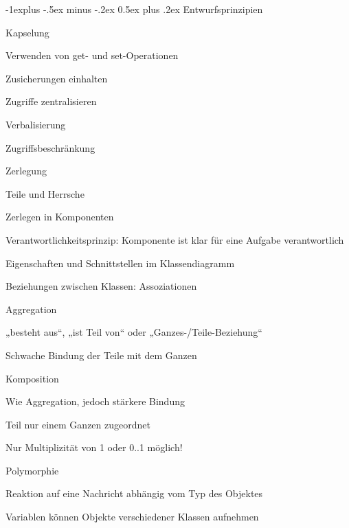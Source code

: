 \documentclass[a4paper]{article}
\makeatletter
\renewcommand{\subsection}{\@startsection{subsection}{2}{0mm}%
                                {-1explus -.5ex minus -.2ex}%
                                {0.5ex plus .2ex}%
                                {\normalfont\normalsize\bfseries}}
\makeatother
\begin{document}
\begin{multicols}{3}
  \subsection{Entwurfsprinzipien}
  \begin{itemize*}
    \item Kapselung
    \begin{itemize*}
      \item Verwenden von get- und set-Operationen
      \item Zusicherungen einhalten
      \item Zugriffe zentralisieren
      \item Verbalisierung
      \item Zugriffsbeschränkung
    \end{itemize*}
    \item Zerlegung
    \begin{itemize*}
      \item Teile und Herrsche
      \item Zerlegen in Komponenten
      \item Verantwortlichkeitsprinzip: Komponente ist klar für eine Aufgabe verantwortlich
      \item Eigenschaften und Schnittstellen im Klassendiagramm
      \item Beziehungen zwischen Klassen: Assoziationen
      \item Aggregation
      \begin{itemize*}
        \item „besteht aus“, „ist Teil von“ oder „Ganzes-/Teile-Beziehung“
        \item Schwache Bindung der Teile mit dem Ganzen
      \end{itemize*}
      \item Komposition
      \begin{itemize*}
        \item Wie Aggregation, jedoch stärkere Bindung
        \item Teil nur einem Ganzen zugeordnet
        \item Nur Multiplizität von 1 oder 0..1 möglich!
      \end{itemize*}
      \item Polymorphie
      \begin{itemize*}
        \item Reaktion auf eine Nachricht abhängig vom Typ des Objektes
        \item Variablen können Objekte verschiedener Klassen aufnehmen

\end{itemize*}
\end{itemize*}
\end{itemize*}
\end{multicols}
\end{document}
